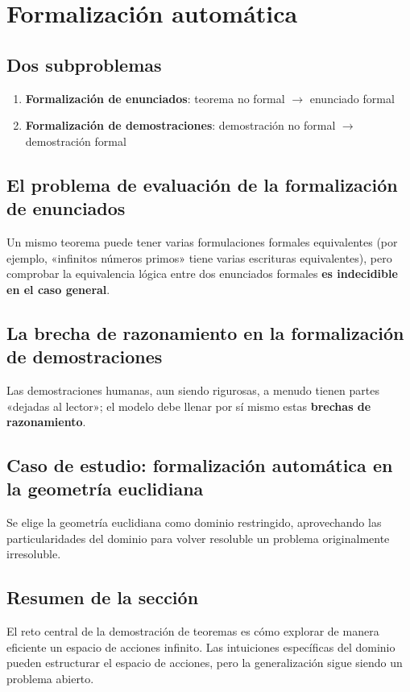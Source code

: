 \section{Formalización automática}

\subsection{Dos subproblemas}

\begin{enumerate}
    \item \textbf{Formalización de enunciados}: teorema no formal $\to$ enunciado formal
    \item \textbf{Formalización de demostraciones}: demostración no formal $\to$ demostración formal
\end{enumerate}

\subsection{El problema de evaluación de la formalización de enunciados}

Un mismo teorema puede tener varias formulaciones formales equivalentes (por ejemplo, «infinitos números primos» tiene varias escrituras equivalentes), pero comprobar la equivalencia lógica entre dos enunciados formales \textbf{es indecidible en el caso general}.

\subsection{La brecha de razonamiento en la formalización de demostraciones}

Las demostraciones humanas, aun siendo rigurosas, a menudo tienen partes «dejadas al lector»; el modelo debe llenar por sí mismo estas \textbf{brechas de razonamiento}.

\subsection{Caso de estudio: formalización automática en la geometría euclidiana}

Se elige la geometría euclidiana como dominio restringido, aprovechando las particularidades del dominio para volver resoluble un problema originalmente irresoluble.

\subsection{Resumen de la sección}

El reto central de la demostración de teoremas es cómo explorar de manera eficiente un espacio de acciones infinito. Las intuiciones específicas del dominio pueden estructurar el espacio de acciones, pero la generalización sigue siendo un problema abierto.
